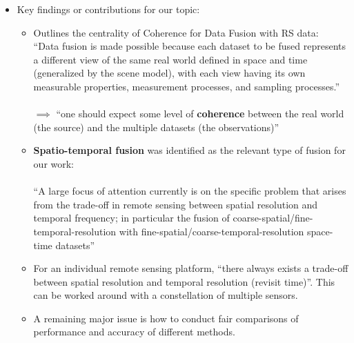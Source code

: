 \begin{itemize}
\begin{itemize}
\begin{itemize}
                \end{itemize}
        \end{itemize}
    \item Key findings or contributions for our topic:
        \begin{itemize}
            \item Outlines the centrality of Coherence for Data Fusion with RS data: \\ 
            
            ``Data fusion is made possible because each dataset to be fused represents a different view of the same real world defined in space and time (generalized by the scene model), 
            with each view having its own measurable properties, measurement processes, and sampling processes.'' \\ 
            \\ 
            $\implies$ ``one should expect some level of \textbf{coherence} between 
            the real world (the source) and the multiple datasets (the observations)''
            \item \textbf{Spatio-temporal fusion} was identified as the relevant type of fusion for our work: \\
            \\
            ``A large focus of attention currently is on the specific problem that arises from the trade-off in remote sensing between spatial resolution and temporal frequency;
            in particular the fusion of coarse-spatial/fine-temporal-resolution with fine-spatial/coarse-temporal-resolution space-time datasets''
            \item For an individual remote sensing platform, ``there always exists a trade-off between spatial resolution and temporal resolution (revisit time)''. This can be worked around with a constellation of multiple sensors. 
            \item A remaining major issue is how to conduct fair comparisons of performance and accuracy of different methods.
        \end{itemize}
\end{itemize}


